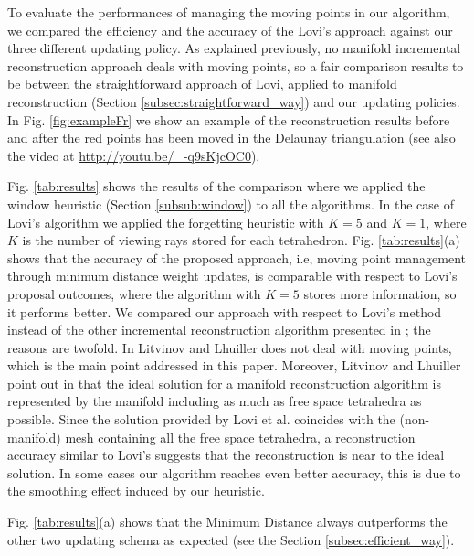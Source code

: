To evaluate the performances of managing the moving points in our algorithm, we compared the efficiency and the accuracy of the Lovi's approach against our three different updating policy.
As explained previously, no manifold incremental reconstruction approach deals with moving points, so a fair comparison results to be between the straightforward approach of Lovi, applied to manifold reconstruction (Section \ref{subsec:straightforward_way}) and our updating policies. In Fig. \ref{fig:exampleFr} we show an example of the reconstruction results before and after the red points has been moved in the Delaunay triangulation (see also the video at \url{http://youtu.be/_-q9sKjcOC0}).

Fig. \ref{tab:results} shows the results of the comparison where we applied the window heuristic (Section \ref{subsub:window}) to all the algorithms. In the case of Lovi's algorithm we applied the forgetting heuristic with $K=5$ and $K=1$, where $K$ is the number of viewing rays stored for each tetrahedron.
Fig.  \ref{tab:results}(a) shows that the accuracy of the proposed approach, i.e, moving point management through minimum distance weight updates, is comparable with respect to Lovi's proposal outcomes, where the algorithm with $K=5$ stores more information, so it performs better.
We compared our approach with respect to Lovi's method instead of the other incremental reconstruction algorithm presented in \cite{litvinov_lhuillier_13}; the reasons are twofold. 
In \cite{litvinov_lhuillier_13} Litvinov and Lhuiller does not deal with moving points, which is the main point addressed in this paper. Moreover, Litvinov and Lhuiller point out in \cite{litvinov_Lhiuller14} that the ideal solution for a manifold reconstruction algorithm is represented by the manifold including as much as free space tetrahedra as possible. Since the solution provided by Lovi et al. coincides with the (non-manifold) mesh containing all the free space tetrahedra, a reconstruction accuracy similar to Lovi's suggests that the reconstruction is near to the ideal solution. In some cases our algorithm reaches even better accuracy, this is due to the smoothing effect induced by our heuristic.


Fig. \ref{tab:results}(a) shows that the Minimum Distance always outperforms the other two updating schema as expected (see the Section \ref{subsec:efficient_way}).

